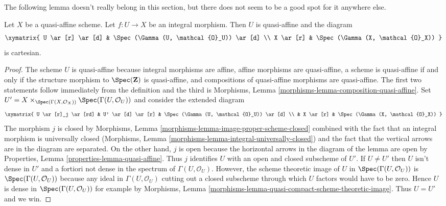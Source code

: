\noindent
The following lemma doesn't really belong in this section, but
there does not seem to be a good spot for it anywhere else.

\begin{lemma}
\label{lemma-integral-over-quasi-affine}
Let $X$ be a quasi-affine scheme. Let $f : U \to X$ be an integral
morphism. Then $U$ is quasi-affine and the diagram
$$
\xymatrix{
U \ar[r] \ar[d] & \Spec(\Gamma(U, \mathcal{O}_U)) \ar[d] \\
X \ar[r] & \Spec(\Gamma(X, \mathcal{O}_X))
}
$$
is cartesian.
\end{lemma}

\begin{proof}
The scheme $U$ is quasi-affine because integral morphisms are affine,
affine morphisms are quasi-affine, a scheme is quasi-affine if and only if
the structure morphism to $\Spec(\mathbf{Z})$ is quasi-affine, and
compositions of quasi-affine morphisms are quasi-affine.
The first two statements follow immediately from the definition
and the third is
Morphisms, Lemma \ref{morphisms-lemma-composition-quasi-affine}.
Set $U' =
X \times_{\Spec(\Gamma(X, \mathcal{O}_X))} \Spec(\Gamma(U, \mathcal{O}_U))$
and consider the extended diagram
$$
\xymatrix{
U \ar[r]_j \ar[rd] & U' \ar[d] \ar[r] &
\Spec(\Gamma(U, \mathcal{O}_U)) \ar[d] \\
& X \ar[r] & \Spec(\Gamma(X, \mathcal{O}_X))
}
$$
The morphism $j$ is closed by
Morphisms, Lemma \ref{morphisms-lemma-image-proper-scheme-closed}
combined with the fact that an integral morphism is universally closed
(Morphisms, Lemma \ref{morphisms-lemma-integral-universally-closed})
and the fact that the vertical arrows are in the diagram are separated.
On the other hand, $j$ is open because the horizontal
arrows in the diagram of the lemma are open by
Properties, Lemma \ref{properties-lemma-quasi-affine}.
Thus $j$ identifies $U$ with an open and closed subscheme of $U'$.
If $U \not = U'$ then $U$ isn't dense in $U'$ and a fortiori
not dense in the spectrum of $\Gamma(U, \mathcal{O}_U)$.
However, the scheme theoretic image of
$U$ in $\Spec(\Gamma(U, \mathcal{O}_U))$ is $\Spec(\Gamma(U, \mathcal{O}_U))$
because any ideal in $\Gamma(U, \mathcal{O}_U)$
cutting out a closed subscheme through which $U$
factors would have to be zero.
Hence $U$ is dense in $\Spec(\Gamma(U, \mathcal{O}_U))$ for example by
Morphisms, Lemma \ref{morphisms-lemma-quasi-compact-scheme-theoretic-image}.
Thus $U = U'$ and we win.
\end{proof}









